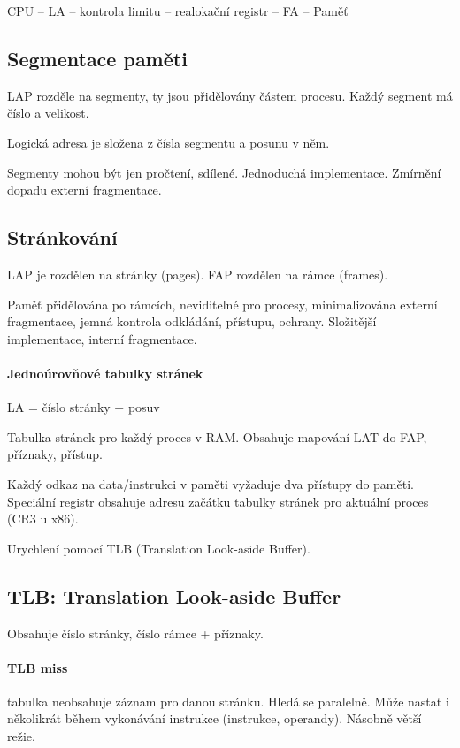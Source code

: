 \documentclass[a4wide]{report}
\begin{document}
CPU -- LA -- kontrola limitu -- realokační registr -- FA -- Paměť

\subsection{Segmentace paměti}

LAP rozděle na segmenty, ty jsou přidělovány částem procesu. Každý segment má číslo a velikost.

Logická adresa je složena z čísla segmentu a posunu v něm.

Segmenty mohou být jen pročtení, sdílené. Jednoduchá implementace. Zmírnění dopadu externí fragmentace.

\subsection{Stránkování}

LAP je rozdělen na stránky (pages). FAP rozdělen na rámce (frames).

Paměť přidělována po rámcích, neviditelné pro procesy, minimalizována externí fragmentace, jemná kontrola odkládání, přístupu, ochrany. Složitější implementace, interní fragmentace.

\paragraph{Jednoúrovňové tabulky stránek}
LA = číslo stránky + posuv

Tabulka stránek pro každý proces v RAM. Obsahuje mapování LAT do FAP, příznaky, přístup.

Každý odkaz na data/instrukci v paměti vyžaduje dva přístupy do paměti. Speciální registr obsahuje adresu začátku tabulky stránek pro aktuální proces (CR3 u x86).

Urychlení pomocí TLB (Translation Look-aside Buffer).

\subsection{TLB: Translation Look-aside Buffer}

Obsahuje číslo stránky, číslo rámce + příznaky.

\paragraph{TLB miss}
tabulka neobsahuje záznam pro danou stránku. Hledá se paralelně. Může nastat i několikrát během vykonávání instrukce (instrukce, operandy). Násobně větší režie.
\end{document}
